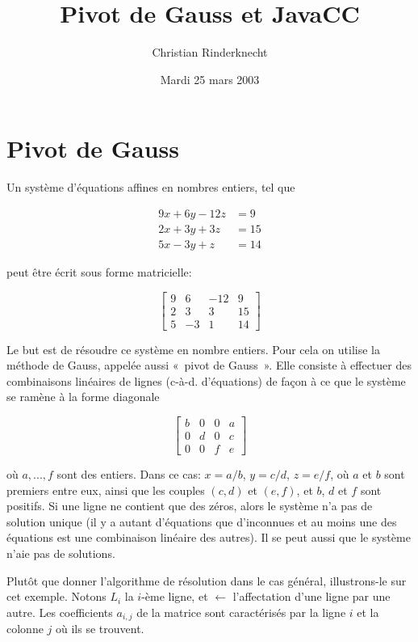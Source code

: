 \documentclass[11pt,a4paper]{article}
\title{Pivot de Gauss et JavaCC}
\author{Christian Rinderknecht}
\date{Mardi 25 mars 2003}
\begin{document}
\maketitle

\section{Pivot de Gauss}

Un système d'équations affines en nombres entiers, tel que

\begin{align}
9x + 6y - 12z &= 9\\
2x + 3y + 3z &= 15\\
5x - 3y +  z &= 14
\end{align}

peut être écrit sous forme matricielle:

\[
\left[
\begin{array}{rrr|r}
9 &  6 & -12 &  9\\
2 &  3 &   3 & 15\\
5 & -3 &   1 & 14
\end{array}
\right]
\]

Le but est de résoudre ce système en nombre entiers. Pour cela on
utilise la méthode de Gauss, appelée aussi «~pivot de Gauss~». Elle
consiste à effectuer des combinaisons linéaires de lignes
(c-à-d. d'équations) de façon à ce que le système se ramène à la forme
diagonale

\[
\left[
\begin{array}{rrr|r}
b & 0 & 0 & a\\
0 & d & 0 & c\\
0 & 0 & f & e
\end{array}
\right]
\]

où $a , ..., f$ sont des entiers. Dans ce cas: $x=a/b$, $y=c/d$,
$z=e/f$, où $a$ et $b$ sont premiers entre eux, ainsi que les couples
$(c,d)$ et $(e,f)$, et $b$, $d$ et $f$ sont positifs. Si une ligne ne
contient que des zéros, alors le système n'a pas de solution unique (il
y a autant d'équations que d'inconnues et au moins une des équations
est une combinaison linéaire des autres). Il se peut aussi que le
système n'aie pas de solutions.

Plutôt que donner l'algorithme de résolution dans le cas général,
illustrons-le sur cet exemple. Notons $L_i$ la $i$-ème ligne, et
$\leftarrow$ l'affectation d'une ligne par une autre. Les coefficients
$a_{i,j}$ de la matrice sont caractérisés par la ligne $i$ et la
colonne $j$ où ils se trouvent.
\end{document}
